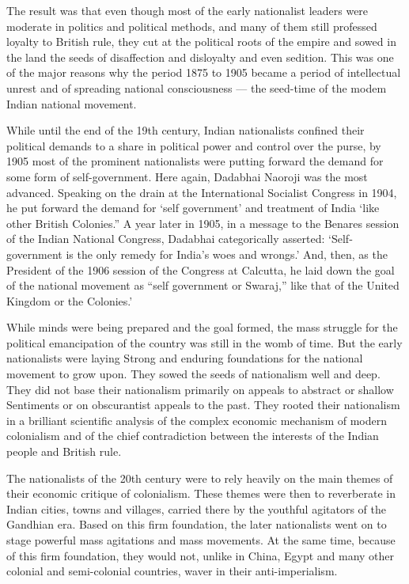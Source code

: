 The result was that even though most of the early nationalist leaders were moderate in politics and political methods, and many of them still professed loyalty to British rule, they cut at the political roots of the empire and sowed in the land the seeds of disaffection and disloyalty and even sedition. This was one of the major reasons why the period 1875 to 1905 became a period of intellectual unrest and of spreading national consciousness — the seed-time of the modem Indian national movement.

While until the end of the 19th century, Indian nationalists confined their political demands to a share in political power and control over the purse, by 1905 most of the prominent nationalists were putting forward the demand for some form of self-government. Here again, Dadabhai Naoroji was the most advanced. Speaking on the drain at the International Socialist Congress in 1904, he put forward the demand for ‘self­ government’ and treatment of India ‘like other British Colonies.” A year later in 1905, in a message to the Benares session of the Indian National Congress, Dadabhai categorically asserted: ‘Self­ government is the only remedy for India’s woes and wrongs.’ And, then, as the President of the 1906 session of the Congress at Calcutta, he laid down the goal of the national movement as “self­ government or Swaraj,” like that of the United Kingdom or the Colonies.’

While minds were being prepared and the goal formed, the mass struggle for the political emancipation of the country was still in the womb of time. But the early nationalists were laying Strong and enduring foundations for the national movement to grow upon. They sowed the seeds of nationalism well and deep. They did not base their nationalism primarily on appeals to abstract or shallow Sentiments or on obscurantist appeals to the past. They rooted their nationalism in a brilliant scientific analysis of the complex economic mechanism of modern colonialism and of the chief contradiction between the interests of the Indian people and British rule.

The nationalists of the 20th century were to rely heavily on the main themes of their economic critique of colonialism. These themes were then to reverberate in Indian cities, towns and villages, carried there by the youthful agitators of the Gandhian era. Based on this firm foundation, the later nationalists went on to stage powerful mass agitations and mass movements. At the same time, because of this firm foundation, they would not, unlike in China, Egypt and many other colonial and semi-colonial countries, waver in their anti-imperialism.
